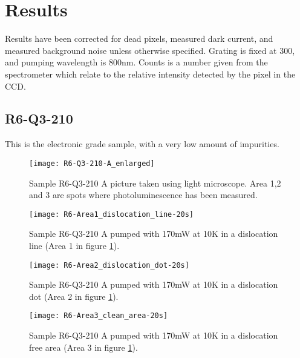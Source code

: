\section{Results}

Results have been corrected for dead pixels, measured dark current, and measured background noise unless otherwise specified. Grating is fixed at 300, and pumping wavelength is 800nm. Counts is a number given from the spectrometer which relate to the relative intensity detected by the pixel in the CCD.

\subsection{R6-Q3-210}

This is the electronic grade sample, with a very low amount of impurities.

\begin{figure}[H]
\centering
\texttt{[image: R6-Q3-210-A\_enlarged]}
\caption[R6-Q3-210 A from light microscope]{Sample R6-Q3-210 A picture taken using light microscope. Area 1,2 and 3 are spots where photoluminescence has been measured.}
\label{fig:R6-Q3-210-A_enlarged}%
\end{figure}


\begin{figure}[H]
\centering
\texttt{[image: R6-Area1\_dislocation\_line-20s]}
\caption[R6-Q3-210 at a dislocation line]{Sample R6-Q3-210 A pumped with 170mW at 10K in a dislocation line (Area 1 in figure \ref{fig:R6-Q3-210-A_enlarged}).}
\label{fig:R6-Area1_dislocation_line-20s}%
\end{figure}


\begin{figure}[H]
\centering
\texttt{[image: R6-Area2\_dislocation\_dot-20s]}
\caption[R6-Q3-210 at a dislocation dot]{Sample R6-Q3-210 A pumped with 170mW at 10K in a dislocation dot (Area 2 in figure \ref{fig:R6-Q3-210-A_enlarged}).}
\label{fig:R6-Area2_dislocation_dot-20s}%
\end{figure}


\begin{figure}[H]
\centering
\texttt{[image: R6-Area3\_clean\_area-20s]}
\caption[R6-Q3-210 at a dislocation free area]{Sample R6-Q3-210 A pumped with 170mW at 10K in a dislocation free area (Area 3 in figure \ref{fig:R6-Q3-210-A_enlarged}).}
\label{fig:R6-Area3_clean_area-20s}%
\end{figure}


